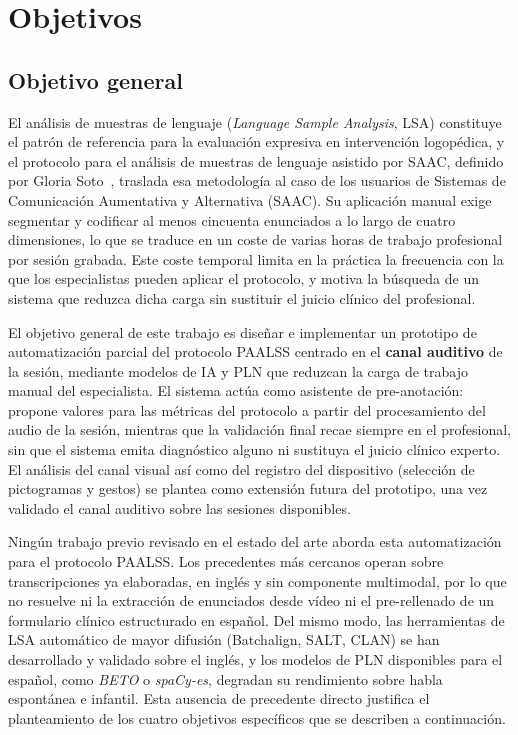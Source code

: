\chapter{Objetivos}
\label{chap:objetivos}

\section{Objetivo general}

El análisis de muestras de lenguaje (\emph{Language Sample Analysis}, \ac{LSA}) constituye el
patrón de referencia para la evaluación expresiva en intervención logopédica, y el
protocolo para el análisis de muestras de lenguaje asistido por \ac{SAAC}, definido por Gloria
Soto~\cite{soto2020protocolo}, traslada esa metodología al caso de los usuarios de
Sistemas de Comunicación Aumentativa y Alternativa (\ac{SAAC}). Su aplicación manual exige
segmentar y codificar al menos cincuenta enunciados a lo largo de cuatro dimensiones, 
lo que se traduce en un coste de varias horas de trabajo profesional por sesión grabada. 
Este coste temporal limita en la práctica la frecuencia con la que los especialistas pueden 
aplicar el protocolo, y motiva la búsqueda de un sistema que reduzca dicha carga sin sustituir 
el juicio clínico del profesional.

El objetivo general de este trabajo es diseñar e implementar un prototipo de
automatización parcial del protocolo \ac{PAALSS} centrado en el \textbf{canal auditivo}
de la sesión, mediante modelos de \ac{IA} y \ac{PLN} que reduzcan la carga de trabajo
manual del especialista. El sistema actúa como asistente de pre-anotación: propone
valores para las métricas del protocolo a partir del procesamiento del audio de la
sesión, mientras que la validación final recae siempre en el profesional, sin que el
sistema emita diagnóstico alguno ni sustituya el juicio clínico experto. El análisis
del canal visual así como del registro del dispositivo (selección de pictogramas y gestos) 
se plantea como extensión futura del prototipo, una vez validado el canal auditivo sobre 
las sesiones disponibles.

Ningún trabajo previo revisado en el estado del arte aborda esta automatización para el
protocolo \ac{PAALSS}. Los precedentes más cercanos operan sobre transcripciones ya elaboradas, 
en inglés y sin componente multimodal, por lo que no resuelve ni la extracción de enunciados
desde vídeo ni el pre-rellenado de un formulario clínico estructurado en español. Del
mismo modo, las herramientas de \ac{LSA} automático de mayor difusión (Batchalign, 
\ac{SALT}, \ac{CLAN}) se han desarrollado y validado sobre el inglés, y los modelos de \ac{PLN} 
disponibles para el español, como \emph{BETO} o \emph{spaCy-es}, degradan su rendimiento sobre 
habla espontánea e infantil. Esta ausencia de precedente directo justifica el planteamiento de los
cuatro objetivos específicos que se describen a continuación.

